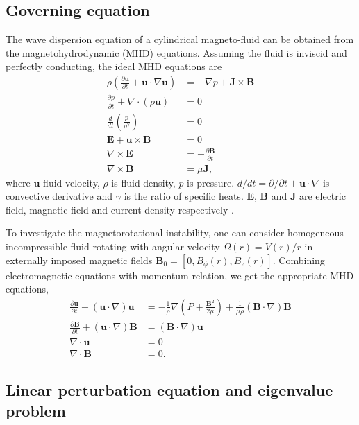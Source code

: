 \documentclass{jfm}
\newcommand{\del}{\nabla}
\begin{document}
%
%
\subsection{Governing equation}

The wave dispersion equation of a cylindrical magneto-fluid can be obtained 
from the magnetohydrodynamic (MHD) equations. Assuming the fluid is inviscid 
and perfectly conducting, the ideal MHD equations are 
\begin{align}
    \rho\left(\frac{\partial\mathbf{u}}{\partial t}+\mathbf{u}\cdot\del\mathbf{u}\right) &= -\del p +\mathbf{J}\times\mathbf{B} \\
    \frac{\partial \rho}{\partial t} + \del\cdot(\rho \mathbf{u})&=0 \\
    \frac{d}{dt}\left(\frac{p}{\rho^\gamma}\right)&=0\\
    \mathbf{E}+\mathbf{u}\times\mathbf{B}&=0 \\
    \del\times \mathbf{E} &= -\frac{\partial \mathbf{B}}{\partial t} \\
    \del \times \mathbf{B} &= \mu \mathbf{J},
\end{align}
where $\mathbf{u}$ fluid velocity, $\rho$ is fluid density, $p$ is pressure. 
$d/dt=\partial/\partial t +\mathbf{u}\cdot\del$ is convective derivative and 
$\gamma$ is the ratio of specific heats. $\mathbf{E}$, $\mathbf{B}$ and 
$\mathbf{J}$ are electric field, magnetic field and current density respectively
\citep{Freidberg1987}.

To investigate the magnetorotational instability, one can consider homogeneous
incompressible fluid rotating with angular velocity $\Omega(r)=V(r) / r$ in
externally imposed magnetic fields $\mathbf{B}_0 = [0,B_\phi(r),B_z(r)]$.
Combining electromagnetic equations with momentum relation, we get the
appropriate MHD equations,
\begin{align}
    \frac{\partial \mathbf{u}}{\partial t}+(\mathbf{u}\cdot\del)\mathbf{u} &= -\frac{1}{\rho}\del\left(P+\frac{\mathbf{B}^2}{2\mu}\right)+\frac{1}{\mu\rho}(\mathbf{B}\cdot\del)\mathbf{B}\\
    \frac{\partial \mathbf{B}}{\partial t} +(\mathbf{u}\cdot\del)\mathbf{B} &=(\mathbf{B}\cdot\del)\mathbf{u} \\
    \del\cdot\mathbf{u}&=0\\
    \del \cdot \mathbf{B} &=0.
\end{align}


%
%
\subsection{Linear perturbation equation and eigenvalue problem}
\end{document}
